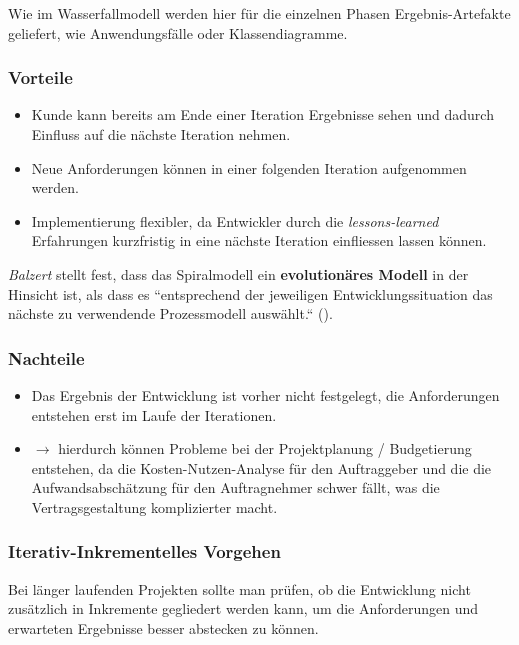 \noindent
Wie im Wasserfallmodell werden hier für die einzelnen Phasen Ergebnis-Artefakte geliefert, wie Anwendungsfälle oder Klassendiagramme.


\subsubsection*{Vorteile}

\begin{itemize}
    \item Kunde kann bereits am Ende einer Iteration Ergebnisse sehen und dadurch Einfluss auf die nächste Iteration nehmen.
    \item Neue Anforderungen können in einer folgenden Iteration aufgenommen werden.
    \item Implementierung flexibler, da Entwickler durch die \textit{lessons-learned} Erfahrungen kurzfristig in eine nächste Iteration einfliessen lassen können.
\end{itemize}

\noindent
\textit{Balzert} stellt fest, dass das Spiralmodell ein \textbf{evolutionäres Modell} in der Hinsicht ist, als dass es ``entsprechend der jeweiligen Entwicklungssituation das nächste zu verwendende Prozessmodell auswählt.`` (\cite[556]{Bal08}).

\subsubsection*{Nachteile}

\begin{itemize}
    \item Das Ergebnis der Entwicklung ist vorher nicht festgelegt, die Anforderungen entstehen erst im Laufe der Iterationen.
    \item[] $\rightarrow$ hierdurch können Probleme bei der Projektplanung / Budgetierung entstehen, da die Kosten-Nutzen-Analyse für den Auftraggeber und die die Aufwandsabschätzung für den Auftragnehmer schwer fällt, was die Vertragsgestaltung komplizierter macht.
\end{itemize}

\subsubsection*{Iterativ-Inkrementelles Vorgehen}
Bei länger laufenden Projekten sollte man prüfen, ob die Entwicklung nicht zusätzlich in Inkremente gegliedert werden kann, um die Anforderungen und erwarteten Ergebnisse besser abstecken zu können.

